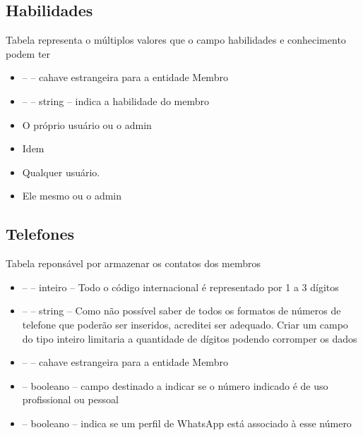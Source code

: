 \documentclass{article}
\newcommand{\codigo}[3]{}
\begin{document}
        \subsection{Habilidades}

            Tabela representa o múltiplos valores que o campo habilidades e conhecimento podem ter
            \codigo{19}{28}{Habilidades}
            \begin{itemize}
                \item \key  \fk --  -- cahave estrangeira para a entidade Membro
                \item \key --  -- string -- indica a habilidade do membro
                \item \criar O próprio usuário ou o admin
                \item \atualizar Idem
                \item \ler Qualquer usuário.
                \item \deletar Ele mesmo ou o admin
            \end{itemize}

        \subsection{Telefones}

            Tabela reponsável por armazenar os contatos dos membros
            \codigo{30}{42}{Telefones}
            \begin{itemize}
                \item \key --  -- inteiro -- Todo o código internacional
                é representado por 1 a 3 dígitos
                \item \key --  -- string -- Como não possível saber de todos os
                formatos de números de telefone que poderão ser inseridos, acreditei ser adequado.
                Criar um campo do tipo inteiro limitaria a quantidade de dígitos podendo corromper
                os dados
                \item \key  \fk --  -- cahave estrangeira para a entidade Membro
                \item {} -- booleano -- campo destinado a indicar se o número
                indicado é de uso profissional ou pessoal
                \item {} -- booleano -- indica se um perfil de WhatsApp está associado
                à esse número
            \end{itemize}
\end{document}
